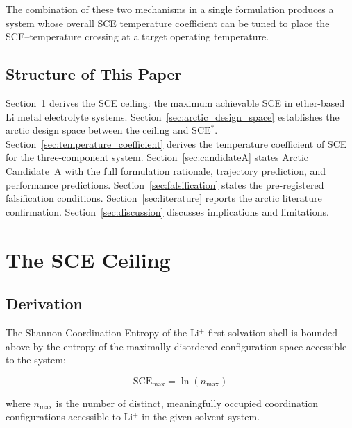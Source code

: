 \documentclass[11pt]{article}
\theoremstyle{plain}
\theoremstyle{definition}
\theoremstyle{remark}
\begin{document}
The combination of these two mechanisms in a single formulation
produces a system whose overall SCE temperature coefficient can be
tuned to place the SCE--temperature crossing at a target operating
temperature.

\subsection{Structure of This Paper}

Section~\ref{sec:SCE_ceiling} derives the SCE ceiling: the maximum
achievable SCE in ether-based Li metal electrolyte systems.
Section~\ref{sec:arctic_design_space} establishes the arctic design
space between the ceiling and $\mathrm{SCE}^{*}$.
Section~\ref{sec:temperature_coefficient} derives the
temperature coefficient of SCE for the three-component system.
Section~\ref{sec:candidateA} states Arctic Candidate~A with the
full formulation rationale, trajectory prediction, and performance
predictions.  Section~\ref{sec:falsification} states the
pre-registered falsification conditions.
Section~\ref{sec:literature} reports the arctic literature
confirmation.  Section~\ref{sec:discussion} discusses implications
and limitations.

\section{The SCE Ceiling}
\label{sec:SCE_ceiling}

\subsection{Derivation}

The Shannon Coordination Entropy of the Li$^+$ first solvation shell
is bounded above by the entropy of the maximally disordered
configuration space accessible to the system:

\begin{equation}
  \mathrm{SCE}_{\max} = \ln(n_{\max})
  \label{eq:SCE_max_def}
\end{equation}

where $n_{\max}$ is the number of distinct, meaningfully occupied
coordination configurations accessible to Li$^+$ in the given
solvent system.
\end{document}
